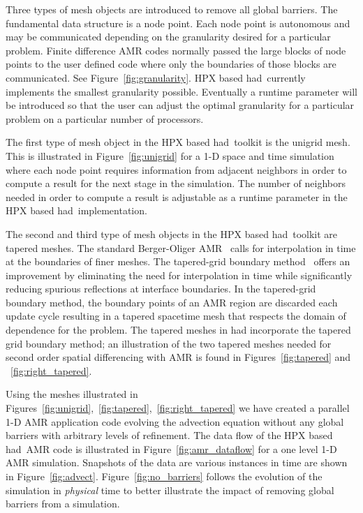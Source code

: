 \documentclass[prd,aps,showpacs,nofootinbib,floats,floatfix,twocolumn,letterpaper]{revtex4}
\newcommand{\had}{{\sc had}}
\begin{document}
Three types of mesh objects are introduced to remove all global barriers.  The fundamental
data structure is a node point.  Each node point is autonomous and may be communicated
depending on the granularity desired for a particular problem.  
Finite difference AMR codes normally passed the large blocks of node points to the user defined
code where only the boundaries of those blocks are communicated.  See Figure~\ref{fig:granularity}.
HPX based \had\ currently implements the smallest granularity possible.  Eventually 
a runtime parameter will be introduced so that the user can adjust the optimal granularity for a
particular problem on a particular number of processors.  

The first type of mesh object in the HPX based \had\ toolkit is the unigrid mesh.  This is illustrated
 in Figure~\ref{fig:unigrid} for a 1-D space and time simulation where each node point requires information
from adjacent neighbors in order to compute a result for the next stage in the simulation.
The number of neighbors needed in order to compute a result is adjustable as a runtime parameter 
in the HPX based \had\ implementation.

The second and third type of mesh objects in the HPX based \had\ toolkit are tapered meshes.
The standard Berger-Oliger AMR~\cite{Berger} calls for interpolation in time at the boundaries
of finer meshes.  The tapered-grid boundary method~\cite{Lehner:2005vc}   
offers an improvement by eliminating the need for interpolation in time while significantly
reducing spurious reflections at interface boundaries.  In the tapered-grid boundary method, the boundary points
of an AMR region are discarded each update cycle resulting in a tapered spacetime mesh that respects the domain of
dependence for the problem.  The tapered meshes in \had
incorporate the tapered grid boundary method; an illustration of the two tapered meshes
needed for second order spatial differencing with AMR is found in Figures~\ref{fig:tapered} and ~\ref{fig:right_tapered}.

Using the meshes illustrated in Figures~\ref{fig:unigrid},~\ref{fig:tapered},~\ref{fig:right_tapered} we have created
a parallel 1-D AMR application code evolving the advection equation without any global barriers with arbitrary 
levels of refinement.  The data flow of the HPX based \had\ AMR code is illustrated in Figure~\ref{fig:amr_dataflow} 
for a one level 1-D AMR simulation.   Snapshots of the data are various instances in time are shown in 
Figure~\ref{fig:advect}.  Figure~\ref{fig:no_barriers} follows the evolution of the simulation in {\it physical} time
to better illustrate the impact of removing global barriers from a simulation.
\end{document}
